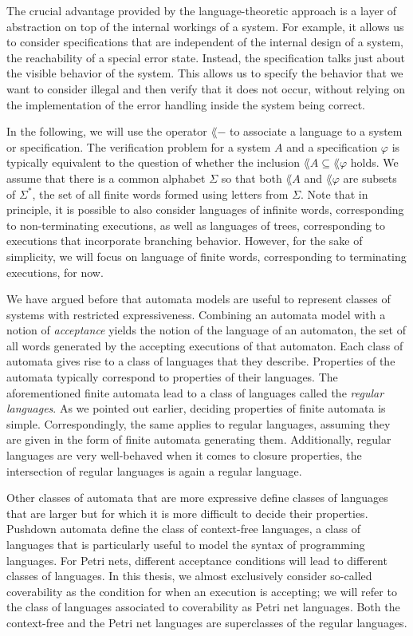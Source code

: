 \documentclass[../../diss.tex]{subfiles}
\begin{document}
The crucial advantage provided by the language-theoretic approach is a layer of abstraction on top of the internal workings of a system.
For example, it allows us to consider specifications that are independent of the internal design of a system, \eg the reachability of a special error state.
Instead, the specification talks just about the visible behavior of the system.
This allows us to specify the behavior that we want to consider illegal and then verify that it does not occur, without relying on the implementation of the error handling inside the system being correct.

In the following, we will use the operator $\lang{-}$ to associate a language to a system or specification.
The verification problem for a system $A$ and a specification $\varphi$ is typically equivalent to the question of whether the inclusion $\lang{A} \subseteq \lang{\varphi}$ holds.
We assume that there is a common alphabet $\Sigma$ so that both $\lang{A}$ and $\lang{\varphi}$ are subsets of $\Sigma^*$, the set of all finite words formed using letters from $\Sigma$.
Note that in principle, it is possible to also consider languages of infinite words, corresponding to non-terminating executions, as well as languages of trees, corresponding to executions that incorporate branching behavior.
However, for the sake of simplicity, we will focus on language of finite words, corresponding to terminating executions, for now.

We have argued before that automata models are useful to represent classes of systems with restricted expressiveness.
Combining an automata model with a notion of \emph{acceptance} yields the notion of the language of an automaton, the set of all words generated by the accepting executions of that automaton.
Each class of automata gives rise to a class of languages that they describe.
Properties of the automata typically correspond to properties of their languages.
The aforementioned finite automata lead to a class of languages called the \emph{regular languages}.
As we pointed out earlier, deciding properties of finite automata is simple.
Correspondingly, the same applies to regular languages, assuming they are given in the form of finite automata generating them.
Additionally, regular languages are very well-behaved when it comes to closure properties, \eg the intersection of regular languages is again a regular language.

Other classes of automata that are more expressive define classes of languages that are larger but for which it is more difficult to decide their properties.
Pushdown automata define the class of context-free languages, a class of languages that is particularly useful to model the syntax of programming languages.
For Petri nets, different acceptance conditions will lead to different classes of languages.
In this thesis, we almost exclusively consider so-called coverability as the condition for when an execution is accepting; we will refer to the class of languages associated to coverability as Petri net languages.
Both the context-free and the Petri net languages are superclasses of the regular languages.
\end{document}
